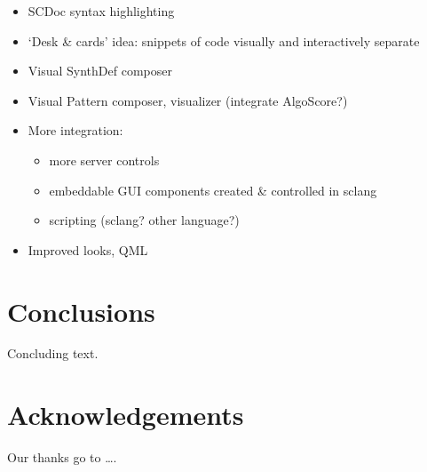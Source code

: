 \documentclass[11pt,a4paper]{article}
\begin{document}
\begin{itemize}
 \item SCDoc syntax highlighting
 \item `Desk \& cards' idea: snippets of code visually and interactively separate
 \item Visual SynthDef composer
 \item Visual Pattern composer, visualizer (integrate AlgoScore?)
 \item More integration:
 \begin{itemize}
    \item more server controls
    \item  embeddable GUI components created \& controlled in sclang
    \item  scripting (sclang? other language?)
 \end{itemize}
 \item Improved looks, QML
\end{itemize}

\section{Conclusions}

Concluding text.

\section{Acknowledgements}

Our thanks go to \ldots .



\end{document}
